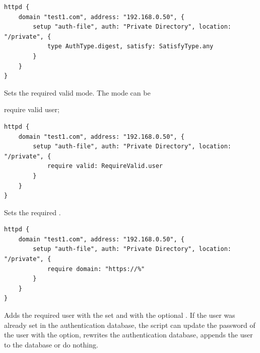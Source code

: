 \begin{lstlisting}[style=Java]
httpd {
    domain "test1.com", address: "192.168.0.50", {
        setup "auth-file", auth: "Private Directory", location: "/private", {
            type AuthType.digest, satisfy: SatisfyType.any
        }
    }
}
\end{lstlisting}


Sets the required valid mode. The mode can be 
\begin{asparaitem}
\item {} require valid user;
\end{asparaitem}

\begin{lstlisting}[style=Java]
httpd {
    domain "test1.com", address: "192.168.0.50", {
        setup "auth-file", auth: "Private Directory", location: "/private", {
            require valid: RequireValid.user
        }
    }
}
\end{lstlisting}


Sets the required .

\begin{lstlisting}[style=Java]
httpd {
    domain "test1.com", address: "192.168.0.50", {
        setup "auth-file", auth: "Private Directory", location: "/private", {
            require domain: "https://%"
        }
    }
}
\end{lstlisting}


Adds the required user with the set  and with the optional .
If the user was already set in the authentication database, the script can
update the password of the user with the 
option,  rewrites the authentication database,
 appends the user to the database or
 do nothing.


